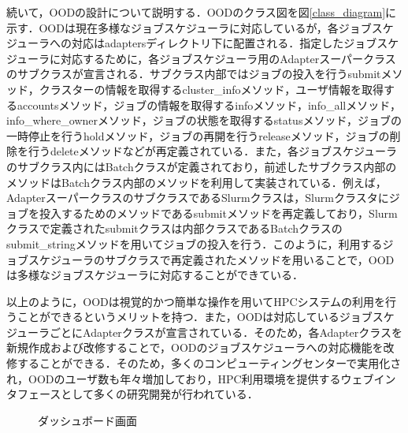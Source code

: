 続いて，OODの設計について説明する．OODのクラス図を図\ref{class_diagram}に示す．OODは現在多様なジョブスケジューラに対応しているが，各ジョブスケジューラへの対応はadaptersディレクトリ下に配置される．指定したジョブスケジューラに対応するために，各ジョブスケジューラ用のAdapterスーパークラスのサブクラスが宣言される．サブクラス内部ではジョブの投入を行うsubmitメソッド，クラスターの情報を取得するcluster\_infoメソッド，ユーザ情報を取得するaccountsメソッド，ジョブの情報を取得するinfoメソッド，info\_allメソッド，info\_where\_ownerメソッド，ジョブの状態を取得するstatusメソッド，ジョブの一時停止を行うholdメソッド，ジョブの再開を行うreleaseメソッド，ジョブの削除を行うdeleteメソッドなどが再定義されている．また，各ジョブスケジューラのサブクラス内にはBatchクラスが定義されており，前述したサブクラス内部のメソッドはBatchクラス内部のメソッドを利用して実装されている．例えば，AdapterスーパークラスのサブクラスであるSlurmクラスは，Slurmクラスタにジョブを投入するためのメソッドであるsubmitメソッドを再定義しており，Slurmクラスで定義されたsubmitクラスは内部クラスであるBatchクラスのsubmit\_stringメソッドを用いてジョブの投入を行う．このように，利用するジョブスケジューラのサブクラスで再定義されたメソッドを用いることで，OODは多様なジョブスケジューラに対応することができている．\par
以上のように，OODは視覚的かつ簡単な操作を用いてHPCシステムの利用を行うことができるというメリットを持つ．また，OODは対応しているジョブスケジューラごとにAdapterクラスが宣言されている．そのため，各Adapterクラスを新規作成および改修することで，OODのジョブスケジューラへの対応機能を改修することができる．そのため，多くのコンピューティングセンターで実用化され，OODのユーザ数も年々増加しており，HPC利用環境を提供するウェブインタフェースとして多くの研究開発が行われている．\par

\begin{figure}[t]
    \centering
    \caption{ダッシュボード画面}
    \label{dashboard}
\end{figure}

